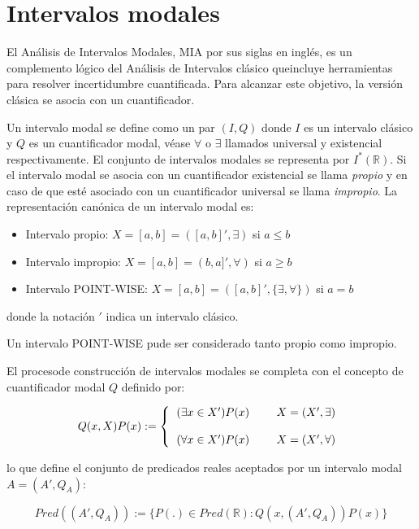 \section{Intervalos modales}

El Análisis de Intervalos Modales, MIA por sus siglas en inglés, es un complemento lógico del Análisis de Intervalos clásico queincluye herramientas para resolver incertidumbre cuantificada. Para alcanzar este objetivo, la versión clásica se asocia con un cuantificador.
\par Un intervalo modal se define como un par $(I,Q)$ donde $I$ es un intervalo clásico y $Q$ es un cuantificador modal, véase $\forall$ o $\exists$ llamados universal y existencial respectivamente. El conjunto de intervalos modales se representa por $I^*(\mathbb{R})$. Si el intervalo modal se asocia con un cuantificador existencial se llama{ \em propio} y en caso de que esté asociado con un cuantificador universal se llama{ \em impropio}. La representación canónica de un intervalo modal es:

\begin{itemize}
	\item Intervalo propio: $X = [a,b] = ([a,b]',\exists)$ si $a \leq b$
	\item Intervalo impropio: $X = [a,b] = (b,a]',\forall)$ si $a \geq b$
	\item Intervalo POINT-WISE: $X = [a,b] = ([a,b]',\{ \exists, \forall \})$ si $a = b$
\end{itemize}

donde la notación $'$ indica un intervalo clásico.
\par Un intervalo POINT-WISE pude ser considerado tanto propio como impropio.
\par El procesode construcción de intervalos modales se completa con el concepto de cuantificador modal $Q$ definido por:

\begin{equation}
Q(x,X)P(x) := \left\{ \begin{tabular}{l l l}
$(\exists x \in X')P(x)$ & & $X = (X', \exists)$ \\
& & \\
$(\forall x \in X')P(x)$ & & $X = (X', \forall)$
\end{tabular}
\right.
\nonumber
\end{equation}

lo que define el conjunto de predicados reales aceptados por un intervalo modal $A = (A',Q_A)$:

\begin{equation}
Pred((A',Q_A)) := \{ P(.) \in Pred(\mathbb{R}) : Q(x,(A',Q_A))P(x) \}
\nonumber
\end{equation}

